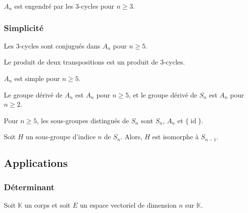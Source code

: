 	\begin{proposition}
		$A_n$ est engendré par les $3$-cycles pour $n \geq 3$.
	\end{proposition}

	\subsubsection{Simplicité}


	\begin{lemma}
		Les $3$-cycles sont conjugués dans $A_n$ pour $n \geq 5$.
	\end{lemma}


	\begin{lemma}
		Le produit de deux transpositions est un produit de $3$-cycles.
	\end{lemma}


	\begin{theorem}
		$A_n$ est simple pour $n \geq 5$.
	\end{theorem}

	\begin{corollary}
		Le groupe dérivé de $A_n$ est $A_n$ pour $n \geq 5$, et le groupe dérivé de $S_n$ est $A_n$ pour $n \geq 2$.
	\end{corollary}

	\begin{corollary}
		Pour $n \geq 5$, les sous-groupes distingués de $S_n$ sont $S_n$, $A_n$ et $\{ \operatorname{id} \}$.
	\end{corollary}

	\begin{corollary}
		Soit $H$ un sous-groupe d'indice $n$ de $S_n$. Alors, $H$ est isomorphe à $S_{n-1}$.
	\end{corollary}

	\subsection{Applications}

	\subsubsection{Déterminant}


	Soit $\mathbb{K}$ un corps et soit $E$ un espace vectoriel de dimension $n$ sur $\mathbb{K}$.

